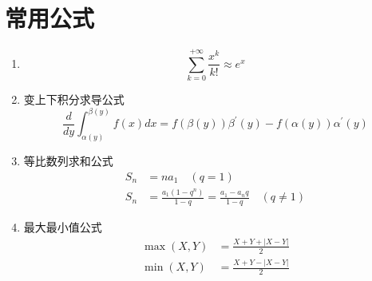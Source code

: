 \section{常用公式}
\begin{enumerate}
	\item 
	\begin{equation}
		\sum_{k=0}^{+\infty}\frac{x^k}{k!} \approx e^x
	\end{equation}

	\item 变上下积分求导公式
	\begin{equation}
		\frac{d}{dy}\int_{\alpha{(y)}}^{\beta{(y)}}f(x)dx = f(\beta(y)){\beta^{'}(y)} - f(\alpha(y)){\alpha^{'}(y)}
	\end{equation}

	\item 等比数列求和公式
	\begin{equation}
	 	\begin{aligned}
			S_n &= n a_1 \quad (q = 1) \\
			S_n &=  \frac{a_1(1-q^n)}{1-q} = \frac{a_1 - a_n q}{1-q} \quad (q \neq 1)
		\end{aligned}
	 \end{equation}

	 \item 最大最小值公式
	 \begin{align}
	 	\max(X,Y) &= \frac{X+Y+|X-Y|}{2} \\
	 	\min(X,Y) &= \frac{X+Y-|X-Y|}{2}
	 \end{align}


\end{enumerate}